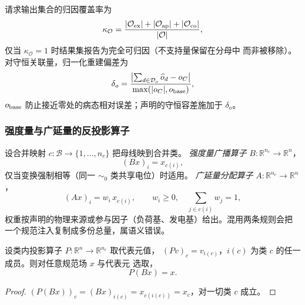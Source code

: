 \begin{definition}[归因覆盖率与重建偏差]\label{def:sp-th-coverage}
请求输出集合的归因覆盖率为
\begin{equation}
\kappa_{\mathcal O}=
\frac{|\mathcal O_{\rm ex}|+|\mathcal O_{\rm ap}|+|\mathcal O_{\rm co}|}
{|\mathcal O|},
\label{eq:sp-th-kappa}
\end{equation}
仅当 $\kappa_{\mathcal O}=1$ 时结果集报告为完全可归因（不支持量保留在分母中
而非被移除）。对守恒关联量，归一化重建偏差为
\begin{equation}
\delta_o=\frac{\bigl|\sum_{d\in\mathcal D_o}\widehat{o}_d-o_C\bigr|}
{\max(|o_C|,o_{\rm base})},
\label{eq:sp-th-delta}
\end{equation}
$o_{\rm base}$ 防止接近零处的病态相对误差；声明的守恒容差施加于 $\delta_o$。
\end{definition}

\subsubsection{强度量与广延量的反投影算子}
\begin{definition}[反投影算子]\label{def:sp-th-backproj}
设合并映射 $c:\mathcal B\to\{1,\dots,n_c\}$ 把母线映到合并类。
\emph{强度量广播算子} $B:\mathbb R^{n_c}\to\mathbb R^{n}$，
\begin{equation}
(Bx)_i=x_{c(i)},
\label{eq:sp-th-broadcast}
\end{equation}
仅当变换强制相等（同一 $\sim_0$ 类共享电位）时适用。
\emph{广延量分配算子} $A:\mathbb R^{n_c}\to\mathbb R^{n}$，
\begin{equation}
(Ax)_i=w_i\,x_{c(i)},\qquad w_i\ge0,\quad
\sum_{j\in c(i)}w_j=1,
\label{eq:sp-th-alloc}
\end{equation}
权重按声明的物理来源或参与因子（负荷基、发电基）给出。混用两条规则会把
一个规范注入复制成多份总量，属语义错误。
\end{definition}

\begin{lemma}[强度量往返恒等]\label{lem:sp-th-roundtrip}
设类内投影算子 $P:\mathbb R^{n}\to\mathbb R^{n_c}$ 取代表元值，
$(Pv)_c=v_{i(c)}$，$i(c)$ 为类 $c$ 的任一成员。则对任意规范场 $x$ 与代表元
选取，
\begin{equation}
P(Bx)=x.
\end{equation}
\end{lemma}
\begin{proof}
$(P(Bx))_c=(Bx)_{i(c)}=x_{c(i(c))}=x_c$，对一切类 $c$ 成立。
\end{proof}

